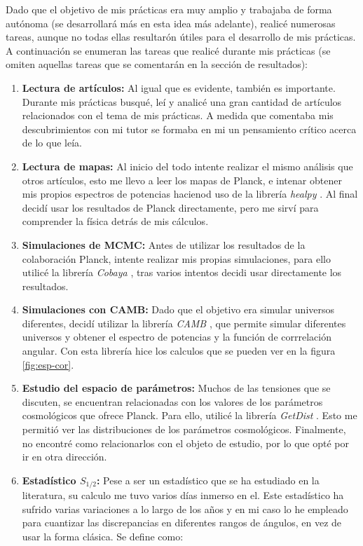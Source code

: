 \documentclass[12pt, a4paper]{article}
\theoremstyle{definition}
\begin{document}
Dado que el objetivo de mis prácticas era muy amplio y trabajaba de forma autónoma (se desarrollará más en esta idea más adelante), realicé numerosas tareas, aunque no todas ellas resultarón útiles para el desarrollo de mis prácticas. A continuación se enumeran las tareas que realicé durante mis prácticas (se omiten aquellas tareas que se comentarán en la sección de resultados):
\begin{enumerate}
  \item \textbf{Lectura de artículos:} Al igual que es evidente, también es importante. Durante mis prácticas busqué, leí y analicé una gran cantidad de artículos relacionados con el tema de mis prácticas. A medida que comentaba mis descubrimientos con mi tutor se formaba en mi un pensamiento crítico acerca de lo que leía.
  \item \textbf{Lectura de mapas:} Al inicio del todo intente realizar el mismo análisis que otros artículos, esto me llevo a leer los mapas de Planck, e intenar obtener mis propios espectros de potencias hacienod uso de la librería \textit{healpy} \autocite{Zonca2019,healpix}. Al final decidí usar los resultados de Planck directamente, pero me sirví para comprender la física detrás de mis cálculos.
  \item \textbf{Simulaciones de MCMC:} Antes de utilizar los resultados de la colaboración Planck, intente realizar mis propias simulaciones, para ello utilicé la librería \textit{Cobaya} \autocite{cobaya}, tras varios intentos decidi usar directamente los resultados.
  \item \textbf{Simulaciones con CAMB:} Dado que el objetivo era simular universos diferentes, decidí utilizar la librería \textit{CAMB} \autocite{Lewis:1999bs,CAMB_GitHub}, que permite simular diferentes universos y obtener el espectro de potencias y la función de corrrelación angular. Con esta librería hice los calculos que se pueden ver en la figura \ref{fig:esp-cor}.
  \item \textbf{Estudio del espacio de parámetros:} Muchos de las tensiones que se discuten, se encuentran relacionadas con los valores de los parámetros cosmológicos que ofrece Planck. Para ello, utilicé la librería \textit{GetDist} \autocite{Lewis:2019xzd}. Esto me permitió ver las distribuciones de los parámetros cosmológicos. Finalmente, no encontré como relacionarlos con el objeto de estudio, por lo que opté por ir en otra dirección.
  \item \textbf{Estadístico $S_{1/2}$:} Pese a ser un estadístico que se ha estudiado en la literatura, su calculo me tuvo varios días inmerso en el. Este estadístico ha sufrido varias variaciones a lo largo de los años y en mi caso lo he empleado para cuantizar las discrepancias en diferentes rangos de ángulos, en vez de usar la forma clásica. Se define como:

\end{enumerate}
\end{document}
